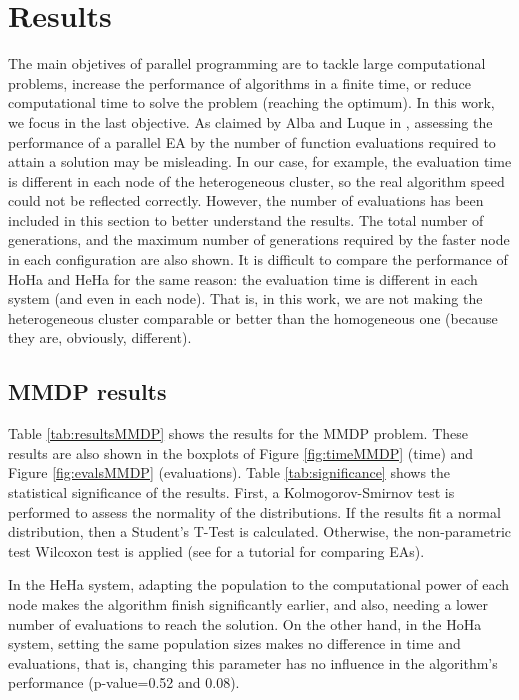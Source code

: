 \documentclass[final,1p,times]{elsarticle}
\begin{document}

\section{Results}
\label{sec:results}

The main objetives of parallel programming are to tackle large computational problems, increase the performance of algorithms in a finite time, or reduce computational time to solve the problem (reaching the optimum). In this work, we focus in the last objective.
As claimed by Alba and Luque in \cite{EVALUATIONPARALLEL}, assessing the performance of a parallel EA by the number of function evaluations required to attain a solution may be misleading. In our case, for example, the evaluation time is different in each node of the heterogeneous cluster, so the real algorithm speed could not be reflected correctly. However, the number of evaluations has been included in this section to better understand the results. The total number of generations, and the maximum number of generations required by the faster node in each configuration are also shown. It is difficult to compare the performance of HoHa and HeHa for the same reason: the evaluation time is different in each system (and even in each node). That is, in this work, we are not making the heterogeneous cluster comparable or better than the homogeneous one (because they are, obviously, different).

\subsection{MMDP results}

Table \ref{tab:resultsMMDP} shows the results for the MMDP problem. These results are also shown in the boxplots of Figure \ref{fig:timeMMDP} (time) and Figure \ref{fig:evalsMMDP} (evaluations). Table \ref{tab:significance} shows the statistical significance of the results. First, a Kolmogorov-Smirnov test is performed to assess the normality of the distributions. If the results fit a normal distribution, then a Student's T-Test is calculated. Otherwise, the non-parametric test Wilcoxon test is applied (see \cite{TUTORIAL} for a tutorial for comparing EAs).

 In the HeHa system, adapting the population to the computational
 power of each node makes the algorithm finish significantly earlier,
 and also, needing a lower number of evaluations to reach the solution. On the other hand, in the HoHa system,
 setting the same population sizes makes no difference in time and
 evaluations, that is, changing this parameter has no influence in the
 algorithm's performance (p-value=0.52 and 0.08).  
\end{document}
